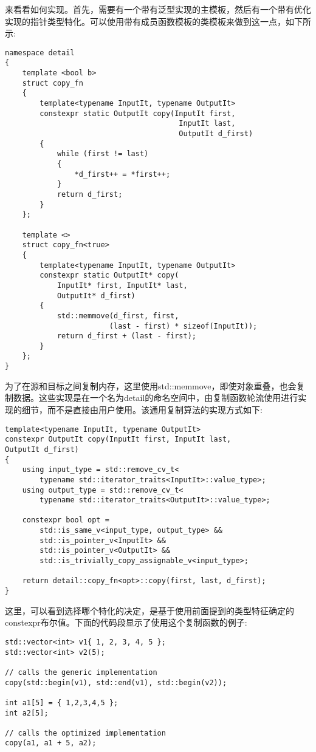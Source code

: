 来看看如何实现。首先，需要有一个带有泛型实现的主模板，然后有一个带有优化实现的指针类型特化。可以使用带有成员函数模板的类模板来做到这一点，如下所示:

\begin{lstlisting}[style=styleCXX]
namespace detail
{
	template <bool b>
	struct copy_fn
	{
		template<typename InputIt, typename OutputIt>
		constexpr static OutputIt copy(InputIt first,
										InputIt last,
										OutputIt d_first)
		{
			while (first != last)
			{
				*d_first++ = *first++;
			}
			return d_first;
		}
	};

	template <>
	struct copy_fn<true>
	{
		template<typename InputIt, typename OutputIt>
		constexpr static OutputIt* copy(
			InputIt* first, InputIt* last,
			OutputIt* d_first)
		{
			std::memmove(d_first, first,
						(last - first) * sizeof(InputIt));
			return d_first + (last - first);
		}
	};
}
\end{lstlisting}

为了在源和目标之间复制内存，这里使用std::memmove，即使对象重叠，也会复制数据。这些实现是在一个名为detail的命名空间中，由复制函数轮流使用进行实现的细节，而不是直接由用户使用。该通用复制算法的实现方式如下:

\begin{lstlisting}[style=styleCXX]
template<typename InputIt, typename OutputIt>
constexpr OutputIt copy(InputIt first, InputIt last,
OutputIt d_first)
{
	using input_type = std::remove_cv_t<
		typename std::iterator_traits<InputIt>::value_type>;
	using output_type = std::remove_cv_t<
		typename std::iterator_traits<OutputIt>::value_type>;
		
	constexpr bool opt =
		std::is_same_v<input_type, output_type> &&
		std::is_pointer_v<InputIt> &&
		std::is_pointer_v<OutputIt> &&
		std::is_trivially_copy_assignable_v<input_type>;
		
	return detail::copy_fn<opt>::copy(first, last, d_first);
}
\end{lstlisting}

这里，可以看到选择哪个特化的决定，是基于使用前面提到的类型特征确定的constexpr布尔值。下面的代码段显示了使用这个复制函数的例子:

\begin{lstlisting}[style=styleCXX]
std::vector<int> v1{ 1, 2, 3, 4, 5 };
std::vector<int> v2(5);

// calls the generic implementation
copy(std::begin(v1), std::end(v1), std::begin(v2));

int a1[5] = { 1,2,3,4,5 };
int a2[5];

// calls the optimized implementation
copy(a1, a1 + 5, a2);
\end{lstlisting}

